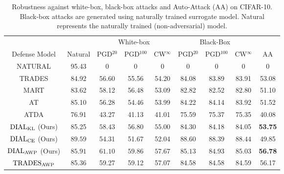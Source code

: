 \begin{table}[ht]
  \caption{Robustness against white-box, black-box attacks and Auto-Attack (AA) on CIFAR-10. Black-box attacks are generated using naturally trained surrogate model. Natural represents the naturally trained (non-adversarial) model.
  }
  \vskip 0.1in
  \label{black-and_white-cifar}
  \centering
  \small
  \begin{tabular}{cccccccc@{\hspace{1\tabcolsep}}c}
    \toprule
    & & \multicolumn{3}{c}{White-box} & \multicolumn{3}{c}{Black-Box} \\
    \cmidrule(r){3-5} 
    \cmidrule(r){6-8}
    Defense Model & Natural & PGD$^{20}$ & PGD$^{100}$ & CW$^{\infty}$ & PGD$^{20}$ & PGD$^{100}$ & CW$^{\infty}$ & AA \\
    \midrule
    NATURAL & 95.43 & 0 & 0 & 0 & 0 & 0 & 0 &  0 \\
    \midrule
    TRADES & 84.92 & 56.60 & 55.56 & 54.20 & 84.08 & 83.89 & 83.91 &  53.08 \\
    MART & 83.62 & 58.12 & 56.48 & 53.09 & 82.82 & 82.52 & 82.80 & 51.10 \\
    AT & 85.10 & 56.28 & 54.46 & 53.99 & 84.22 & 84.14 & 83.92 & 51.52 \\
    ATDA & 76.91 & 43.27 & 41.13 & 41.01 & 75.59 & 75.37 & 75.35 & 40.08\\
    $\operatorname{DIAL}_{\operatorname{KL}}$ (Ours) & 85.25 & $\mathbf{58.43}$ & $\mathbf{56.80}$ & $\mathbf{55.00}$ & 84.30 & 84.18 & 84.05 & \textbf{53.75} \\
    $\operatorname{DIAL}_{\operatorname{CE}}$ (Ours)  & $\mathbf{89.59}$ & 54.31 & 51.67 & 52.04 &$ \mathbf{88.60}$ & $\mathbf{88.39}$ & $\mathbf{88.44}$ & 49.85 \\
    \midrule
    $\operatorname{DIAL}_{\operatorname{AWP}}$ (Ours) & $\mathbf{85.91}$ & $\mathbf{61.10}$ & $\mathbf{59.86}$ & $\mathbf{57.67}$ & $\mathbf{85.13}$ & $\mathbf{84.93}$ & $\mathbf{85.03}$  & \textbf{56.78} \\
    $\operatorname{TRADES}_{\operatorname{AWP}}$ & 85.36 & 59.27 & 59.12 & 57.07 & 84.58 & 84.58 & 84.59 & 56.17 \\
    \bottomrule
  \end{tabular}
\end{table}



